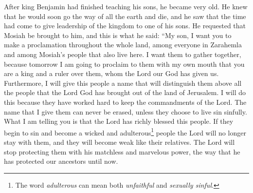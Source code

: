 After king Benjamin had finished teaching his sons, he became very old. He knew that he would soon go the way of all the earth and die, and he saw that the time had come to give leadership of the kingdom to one of his sons.
\bverse \iffalse Therefore, he had Mosiah brought before him; and these are the words which he spake unto him, saying: My son, I would that ye should make a proclamation throughout all this land among all this people, or the people of Zarahemla, and the people of Mosiah who dwell in the land, that thereby they may be gathered together; for on the morrow I shall proclaim unto this my people out of mine own mouth that thou art a king and a ruler over this people, whom the Lord our God hath given us. \fi
He requested that Mosiah be brought to him, and this is what he said: ``My son, I want you to make a proclamation throughout the whole land, among everyone in Zarahemla and among Mosiah's people that also live here. I want them to gather together, because tomorrow I am going to proclaim to them with my own mouth that you are a king and a ruler over them, whom the Lord our God has given us.
\bverse \iffalse And moreover, I will give this people a name, that thereby they may be distinguished above all the people which the Lord God hath brought out of the land of Jerusalem; and this I do because they have been a diligent people in keeping the commandments of the Lord. \fi
Furthermore, I will give this people a name that will distinguish them above all the people that the Lord God has brought out of the land of Jerusalem. I will do this because they have worked hard to keep the commandments of the Lord.
\bverse \iffalse And I give unto them a name that never shall be blotted out, except it be through transgression. \fi
The name that I give them can never be erased, unless they choose to live sin sinfully.
\bverse \iffalse Yea, and moreover I say unto you, that if this highly favored people of the Lord should fall into transgression, and become a wicked and an adulterous people, that the Lord will deliver them up, that thereby they become weak like unto their brethren; and he will no more preserve them by his matchless and marvelous power, as he has hitherto preserved our fathers. \fi
What I am telling you is that the Lord has richly blessed this people. If they begin to sin and become a wicked and adulterous\footnote{The word \textit{adulterous} can mean both \textit{unfaithful} and \textit{sexually sinful}.} people the Lord will no longer stay with them, and they will become weak like their relatives. The Lord will stop protecting them with his matchless and marvelous power, the way that he has protected our ancestors until now.
